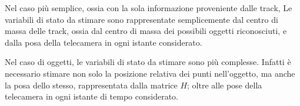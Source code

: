 Nel caso più semplice, ossia con la sola informazione proveniente dalle track, Le variabili di stato da stimare sono rappresentate semplicemente dal centro di massa delle track, ossia dal centro di massa dei possibili oggetti riconosciuti, e dalla posa della telecamera in ogni istante considerato.

Nel caso di oggetti, le variabili di stato da stimare sono più complesse. Infatti è necessario stimare non solo la posizione relativa dei punti nell'oggetto, ma anche la posa dello stesso, rappresentata dalla matrice $H$; oltre alle pose della telecamera in ogni istante di tempo considerato.



